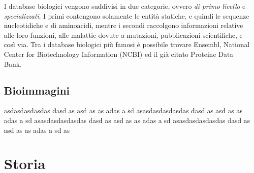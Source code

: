 I database biologici vengono suddivisi in due categorie, ovvero \textit{di primo livello} e \textit{specializzati}. I primi contengono solamente le entità statiche, e quindi le sequenze nucleotidiche e di aminoacidi, mentre i secondi raccolgono informazioni relative alle loro funzioni, alle malattie dovute a mutazioni, pubblicazioni scientifiche, e così via.
\newline
Tra i database biologici più famosi è possibile trovare Ensembl\cite{ensembl}, National Center for Biotechnology Information (NCBI)\cite{NCBI} ed il già citato Proteine Data Bank\cite{proteineDataBank}.


\subsection{Bioimmagini}
asdasdasdasdas dasd as asd as as adas a sd asasdasdasdasdas dasd as asd as as adas a sd asasdasdasdasdas dasd as asd as as adas a sd asasdasdasdasdas dasd as asd as as adas a sd as



\section{Storia}
